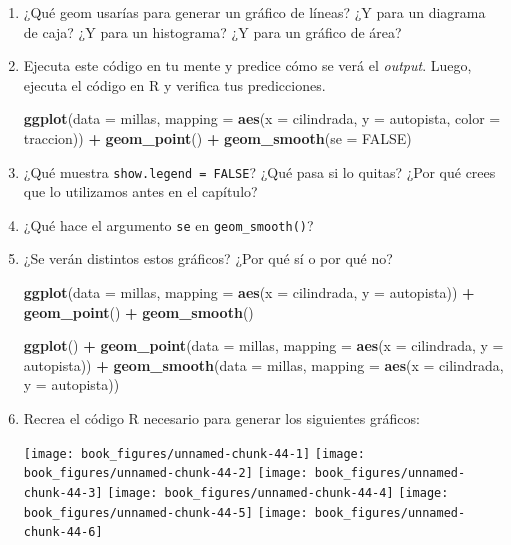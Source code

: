 \documentclass[11pt,oneside]{report}
\newenvironment{Shaded}{\begin{snugshade}}{\end{snugshade}}
\newcommand{\DataTypeTok}[1]{\textcolor[rgb]{0.13,0.29,0.53}{#1}}
\newcommand{\KeywordTok}[1]{\textcolor[rgb]{0.13,0.29,0.53}{\textbf{#1}}}
\newcommand{\NormalTok}[1]{#1}
\newcommand{\OperatorTok}[1]{\textcolor[rgb]{0.81,0.36,0.00}{\textbf{#1}}}
\newcommand{\OtherTok}[1]{\textcolor[rgb]{0.56,0.35,0.01}{#1}}
\newcommand{\StringTok}[1]{\textcolor[rgb]{0.31,0.60,0.02}{#1}}
\begin{document}
\begin{enumerate}
\def\labelenumi{\arabic{enumi}.}
\item
  ¿Qué geom usarías para generar un gráfico de líneas? ¿Y para un
  diagrama de caja? ¿Y para un histograma? ¿Y para un gráfico de área?
\item
  Ejecuta este código en tu mente y predice cómo se verá el
  \emph{output}. Luego, ejecuta el código en R y verifica tus
  predicciones.

\begin{Shaded}
\begin{Highlighting}[]
\KeywordTok{ggplot}\NormalTok{(}\DataTypeTok{data =}\NormalTok{ millas, }\DataTypeTok{mapping =} \KeywordTok{aes}\NormalTok{(}\DataTypeTok{x =}\NormalTok{ cilindrada, }\DataTypeTok{y =}\NormalTok{ autopista, }\DataTypeTok{color =}\NormalTok{ traccion)) }\OperatorTok{+}
\StringTok{  }\KeywordTok{geom_point}\NormalTok{() }\OperatorTok{+}
\StringTok{  }\KeywordTok{geom_smooth}\NormalTok{(}\DataTypeTok{se =} \OtherTok{FALSE}\NormalTok{)}
\end{Highlighting}
\end{Shaded}
\item
  ¿Qué muestra \texttt{show.legend\ =\ FALSE}? ¿Qué pasa si lo quitas?
  ¿Por qué crees que lo utilizamos antes en el capítulo?
\item
  ¿Qué hace el argumento \texttt{se} en \texttt{geom\_smooth()}?
\item
  ¿Se verán distintos estos gráficos? ¿Por qué sí o por qué no?

\begin{Shaded}
\begin{Highlighting}[]
\KeywordTok{ggplot}\NormalTok{(}\DataTypeTok{data =}\NormalTok{ millas, }\DataTypeTok{mapping =} \KeywordTok{aes}\NormalTok{(}\DataTypeTok{x =}\NormalTok{ cilindrada, }\DataTypeTok{y =}\NormalTok{ autopista)) }\OperatorTok{+}
\StringTok{  }\KeywordTok{geom_point}\NormalTok{() }\OperatorTok{+}
\StringTok{  }\KeywordTok{geom_smooth}\NormalTok{()}

\KeywordTok{ggplot}\NormalTok{() }\OperatorTok{+}
\StringTok{  }\KeywordTok{geom_point}\NormalTok{(}\DataTypeTok{data =}\NormalTok{ millas, }\DataTypeTok{mapping =} \KeywordTok{aes}\NormalTok{(}\DataTypeTok{x =}\NormalTok{ cilindrada, }\DataTypeTok{y =}\NormalTok{ autopista)) }\OperatorTok{+}
\StringTok{  }\KeywordTok{geom_smooth}\NormalTok{(}\DataTypeTok{data =}\NormalTok{ millas, }\DataTypeTok{mapping =} \KeywordTok{aes}\NormalTok{(}\DataTypeTok{x =}\NormalTok{ cilindrada, }\DataTypeTok{y =}\NormalTok{ autopista))}
\end{Highlighting}
\end{Shaded}
\item
  Recrea el código R necesario para generar los siguientes gráficos:

  \texttt{[image: book\_figures/unnamed-chunk-44-1]}
  \texttt{[image: book\_figures/unnamed-chunk-44-2]}
  \texttt{[image: book\_figures/unnamed-chunk-44-3]}
  \texttt{[image: book\_figures/unnamed-chunk-44-4]}
  \texttt{[image: book\_figures/unnamed-chunk-44-5]}
  \texttt{[image: book\_figures/unnamed-chunk-44-6]}
\end{enumerate}
\end{document}

